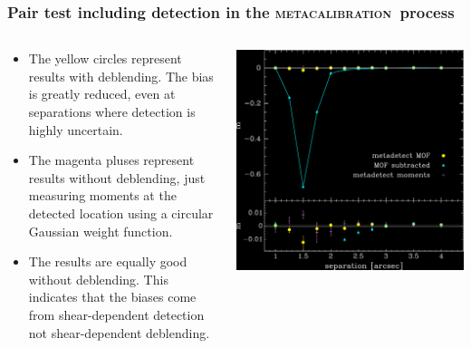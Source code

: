 \documentclass{beamer}
\newcommand{\mcal}{\textsc{metacalibration}}
\begin{document}
\begin{frame}
    \frametitle{Pair test including detection in the \mcal\ process}

 
    \begin{columns}
        \begin{column}{0.4\textwidth}
            \begin{itemize}

                \item The yellow circles represent results with deblending.
                The bias is greatly reduced, even at separations where
                    detection is highly uncertain.

                \item The magenta pluses represent results without deblending, just
                    measuring moments at the detected location using a circular
                    Gaussian weight function.

                \item The results are {\color{lightsteelblue} equally good
                    without deblending}.  This indicates that the biases come
                    from shear-dependent detection  not shear-dependent
                    deblending.

            \end{itemize}
        \end{column}
        \begin{column}{0.6\textwidth}
            \begin{center}
                \includegraphics[width=\columnwidth]{pairs-mc-bdkpair-negate.png}
            \end{center}
        \end{column}
    \end{columns}
\end{frame}
\end{document}
